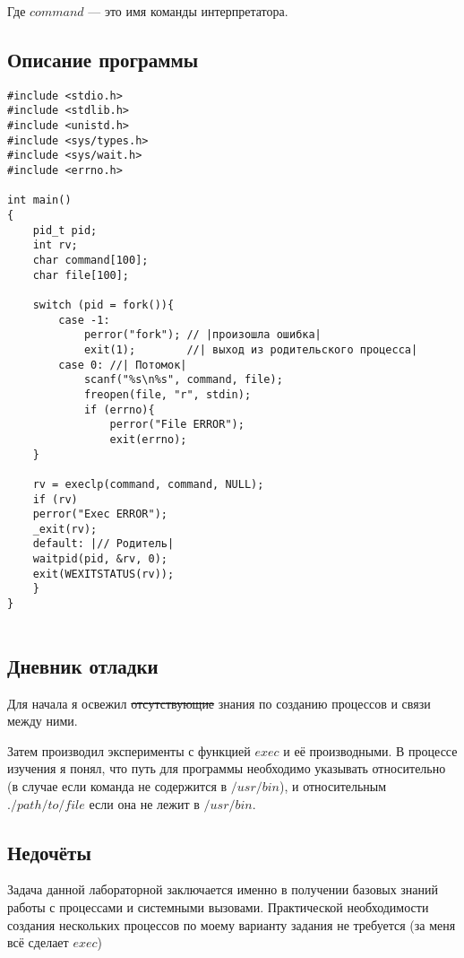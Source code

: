 \documentclass[12pt]{article}
\begin{document}
Где $command$ --- это имя команды интерпретатора.

\subsection*{Описание программы}

\begin{lstlisting}[escapechar=|]
#include <stdio.h>
#include <stdlib.h>
#include <unistd.h>
#include <sys/types.h>
#include <sys/wait.h>
#include <errno.h>

int main()
{
    pid_t pid;
    int rv;
    char command[100];
    char file[100];
    
    switch (pid = fork()){
        case -1:
            perror("fork"); // |произошла ошибка|
            exit(1);        //| выход из родительского процесса|
        case 0: //| Потомок|
            scanf("%s\n%s", command, file);
            freopen(file, "r", stdin);
            if (errno){
                perror("File ERROR");
                exit(errno);
    }
    
    rv = execlp(command, command, NULL);
    if (rv)
    perror("Exec ERROR");
    _exit(rv);
    default: |// Родитель|
    waitpid(pid, &rv, 0);
    exit(WEXITSTATUS(rv));
    }
}
    
\end{lstlisting}
%
%
%

\subsection*{Дневник отладки}  

Для начала я освежил \sout{отсутствующие} знания по созданию процессов и связи между ними.

Затем производил эксперименты с функцией $exec$ и её производными.
В процессе изучения я понял, что путь для программы необходимо указывать относительно (в случае если команда не содержится в $/usr/bin$), и относительным $./path/to/file$ если она не лежит в $/usr/bin$.

\subsection*{Недочёты}

Задача данной лабораторной заключается именно в получении базовых знаний работы с процессами и системными вызовами. Практической необходимости создания нескольких процессов по моему варианту задания не требуется (за меня всё сделает $exec$)
\end{document}
